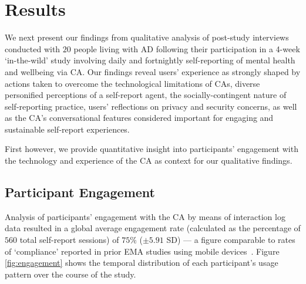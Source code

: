 \section{Results}

    We next present our findings from qualitative analysis of post-study interviews conducted with $20$ people living with \ac{AD} following their participation in a 4-week `in-the-wild' study involving daily and fortnightly self-reporting of mental health and wellbeing via \ac{CA}. Our findings reveal users' experience as strongly shaped by actions taken to overcome the technological limitations of \ac{CA}s, diverse personified perceptions of a self-report agent, the socially-contingent nature of self-reporting practice, users' reflections on privacy and security concerns, as well as the \ac{CA}'s conversational features considered important for engaging and sustainable self-report experiences.
    
    First however, we provide quantitative insight into participants' engagement with the technology and experience of the \ac{CA} as context for our qualitative findings.

    \subsection{Participant Engagement}\label{sec:participant_engagement}
    
        Analysis of participants' engagement with the \ac{CA} by means of interaction log data resulted in a global average engagement rate (calculated as the percentage of $560$ total self-report sessions) of $75\%$ ($\pm 5.91$ SD) --- a figure comparable to rates of `compliance' reported in prior \ac{EMA} studies using mobile devices~\cite{wen2017compliance}. Figure \ref{fig:engagement} shows the temporal distribution of each participant's usage pattern over the course of the study. %
            
